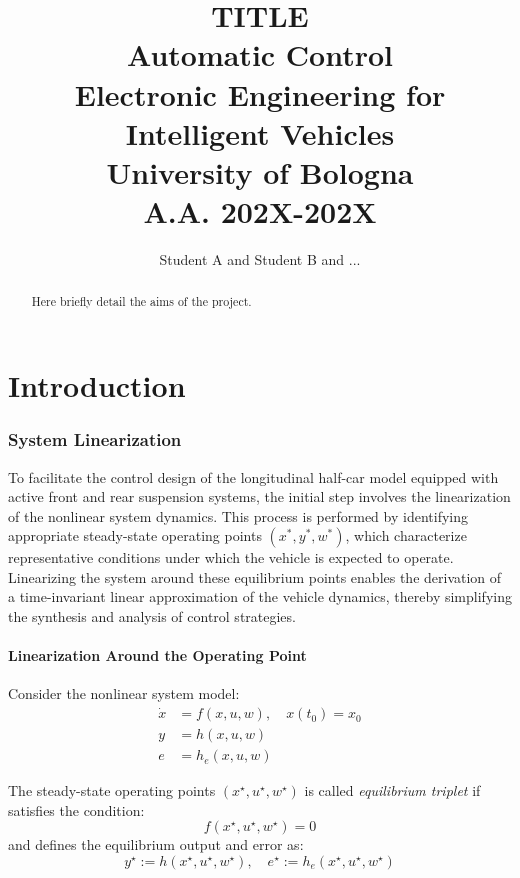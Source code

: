\documentclass[]{report}
\title{{\huge  TITLE} \\
	{\small Automatic Control\\
		Electronic Engineering for Intelligent Vehicles\\
		University of Bologna\\
		A.A. 202X-202X}}
\author{Student A and Student B and ...}
\begin{document}
	\maketitle
	
	\begin{abstract}
		Here briefly detail  the aims of the project.
	\end{abstract}
	
	\chapter{Introduction}
	
\subsection{System Linearization}

To facilitate the control design of the longitudinal half-car model equipped with active front and rear suspension systems, the initial step involves the linearization of the nonlinear system dynamics. This process is performed by identifying appropriate steady-state operating points \((x^*, y^*, w^*)\), which characterize representative conditions under which the vehicle is expected to operate. Linearizing the system around these equilibrium points enables the derivation of a time-invariant linear approximation of the vehicle dynamics, thereby simplifying the synthesis and analysis of control strategies.

\subsubsection{Linearization Around the Operating Point}

Consider the nonlinear system model:
\begin{equation}
	\label{eq:nonlinear_model}
	\begin{aligned}
		\dot{x} &= f(x, u, w), \quad x(t_0) = x_0 \\
		y &= h(x, u, w) \\
		e &= h_e(x, u, w)
	\end{aligned}
\end{equation}

The steady-state operating points \((x^\star, u^\star, w^\star)\) is called \textit{equilibrium triplet} if satisfies the condition:
\begin{equation}
	\label{eq:equilibrium_triplet}
	f(x^\star, u^\star, w^\star) = 0
\end{equation}
and defines the equilibrium output and error as:
\begin{equation}
	\label{eq:equilibrium_output_error}
	y^\star := h(x^\star, u^\star, w^\star), \quad e^\star := h_e(x^\star, u^\star, w^\star)
\end{equation}
\end{document}
